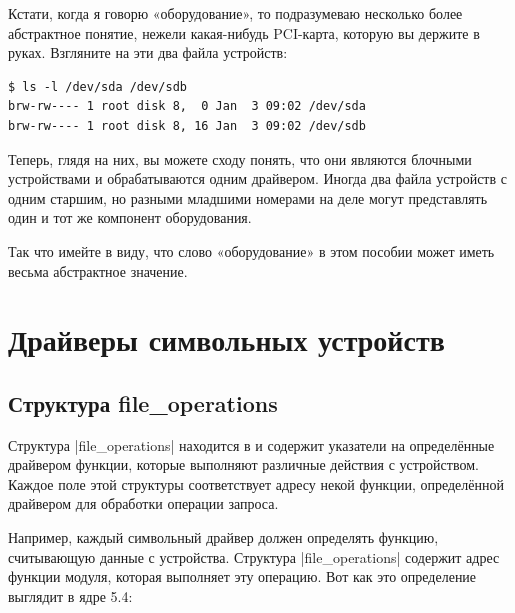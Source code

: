 \documentclass[10pt, oneside]{book}
\begin{document}
Кстати, когда я говорю «оборудование», то подразумеваю несколько более абстрактное понятие, нежели какая-нибудь PCI-карта, которую вы держите в руках. Взгляните на эти два файла устройств:

\begin{verbatim}
$ ls -l /dev/sda /dev/sdb
brw-rw---- 1 root disk 8,  0 Jan  3 09:02 /dev/sda
brw-rw---- 1 root disk 8, 16 Jan  3 09:02 /dev/sdb
\end{verbatim}

Теперь, глядя на них, вы можете сходу понять, что они являются блочными устройствами и обрабатываются одним драйвером. Иногда два файла устройств с одним старшим, но разными младшими номерами на деле могут представлять один и тот же компонент оборудования.

Так что имейте в виду, что слово «оборудование» в этом пособии может иметь весьма абстрактное значение.

\section{Драйверы символьных устройств}
\label{sec:chardev}
\subsection{Структура file\_operations}
\label{sec:file_operations}
Структура \cpp|file_operations| находится в  и содержит указатели на определённые драйвером функции, которые выполняют различные действия с устройством. Каждое поле этой структуры соответствует адресу некой функции, определённой драйвером для обработки операции запроса.

Например, каждый символьный драйвер должен определять функцию, считывающую данные с устройства. Структура \cpp|file_operations| содержит адрес функции модуля, которая выполняет эту операцию.
Вот как это определение выглядит в ядре 5.4:
\end{document}
